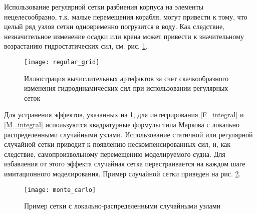 Использование регулярной сетки разбиения корпуса на элементы нецелесообразно, т.к. малые перемещения корабля, могут привести к тому, что целый ряд узлов сетки одновременно погрузится в воду. Как следствие, незначительное изменение осадки или крена может привести к значительному возрастанию гидростатических сил, см. рис. \ref{regular_grid}.

\begin{figure}[ht]
\begin{center}
\texttt{[image: regular\_grid]}
\end{center}
\caption{Иллюстрация вычислительных артефактов за счет скачкообразного изменения гидродинамических сил при использовании регулярных сеток}
\label{regular_grid}
\end{figure}

Для устранения эффектов, указанных на \ref{regular_grid}, для интегрирования \eqref{F=integral} и \eqref{M=integral} используются квадратурные формулы типа Маркова с локально распределенными случайными узлами. Использование статичной или регулярной случайной сетки приводит к появлению нескомпенсированных сил, и, как следствие, самопроизвольному перемещению моделируемого судна. Для избавления от этого эффекта случайная сетка перестраивается на каждом шаге имитационного моделирования. Пример случайной сетки приведен на рис. \ref{monte_carlo}.

\begin{figure}[ht]
\begin{center}
\texttt{[image: monte\_carlo]}
\end{center}
\caption{Пример сетки с локально-распределенными случайными узлами}
\label{monte_carlo}
\end{figure}

